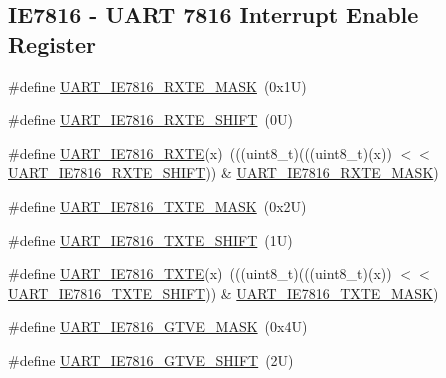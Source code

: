 \subsection*{I\+E7816 -\/ U\+A\+RT 7816 Interrupt Enable Register}
\begin{DoxyCompactItemize}
\item 
\#define \mbox{\hyperlink{group___u_a_r_t___register___masks_gad8d954bf21c5ed93f49c9418f0b1bc5e}{U\+A\+R\+T\+\_\+\+I\+E7816\+\_\+\+R\+X\+T\+E\+\_\+\+M\+A\+SK}}~(0x1\+U)
\item 
\#define \mbox{\hyperlink{group___u_a_r_t___register___masks_ga0df3e70bd53348388872ae57a8f7f156}{U\+A\+R\+T\+\_\+\+I\+E7816\+\_\+\+R\+X\+T\+E\+\_\+\+S\+H\+I\+FT}}~(0\+U)
\item 
\#define \mbox{\hyperlink{group___u_a_r_t___register___masks_ga89648c58d4459c6a081c0abf7eda34b8}{U\+A\+R\+T\+\_\+\+I\+E7816\+\_\+\+R\+X\+TE}}(x)~(((uint8\+\_\+t)(((uint8\+\_\+t)(x)) $<$$<$ \mbox{\hyperlink{group___u_a_r_t___register___masks_ga0df3e70bd53348388872ae57a8f7f156}{U\+A\+R\+T\+\_\+\+I\+E7816\+\_\+\+R\+X\+T\+E\+\_\+\+S\+H\+I\+FT}})) \& \mbox{\hyperlink{group___u_a_r_t___register___masks_gad8d954bf21c5ed93f49c9418f0b1bc5e}{U\+A\+R\+T\+\_\+\+I\+E7816\+\_\+\+R\+X\+T\+E\+\_\+\+M\+A\+SK}})
\item 
\#define \mbox{\hyperlink{group___u_a_r_t___register___masks_ga5968d2ee914444772fe2e6fa65ca848b}{U\+A\+R\+T\+\_\+\+I\+E7816\+\_\+\+T\+X\+T\+E\+\_\+\+M\+A\+SK}}~(0x2\+U)
\item 
\#define \mbox{\hyperlink{group___u_a_r_t___register___masks_gad0266a63ef5e0bb5dfaa2c87c2a1639e}{U\+A\+R\+T\+\_\+\+I\+E7816\+\_\+\+T\+X\+T\+E\+\_\+\+S\+H\+I\+FT}}~(1\+U)
\item 
\#define \mbox{\hyperlink{group___u_a_r_t___register___masks_ga3e38b84d9d75fc7645f9ab3b82966e62}{U\+A\+R\+T\+\_\+\+I\+E7816\+\_\+\+T\+X\+TE}}(x)~(((uint8\+\_\+t)(((uint8\+\_\+t)(x)) $<$$<$ \mbox{\hyperlink{group___u_a_r_t___register___masks_gad0266a63ef5e0bb5dfaa2c87c2a1639e}{U\+A\+R\+T\+\_\+\+I\+E7816\+\_\+\+T\+X\+T\+E\+\_\+\+S\+H\+I\+FT}})) \& \mbox{\hyperlink{group___u_a_r_t___register___masks_ga5968d2ee914444772fe2e6fa65ca848b}{U\+A\+R\+T\+\_\+\+I\+E7816\+\_\+\+T\+X\+T\+E\+\_\+\+M\+A\+SK}})
\item 
\#define \mbox{\hyperlink{group___u_a_r_t___register___masks_ga64b8f696aa038e3a27d743e024632e7d}{U\+A\+R\+T\+\_\+\+I\+E7816\+\_\+\+G\+T\+V\+E\+\_\+\+M\+A\+SK}}~(0x4\+U)
\item 
\#define \mbox{\hyperlink{group___u_a_r_t___register___masks_ga92681ae737e84944e46e525a831303b9}{U\+A\+R\+T\+\_\+\+I\+E7816\+\_\+\+G\+T\+V\+E\+\_\+\+S\+H\+I\+FT}}~(2\+U)

\end{DoxyCompactItemize}
